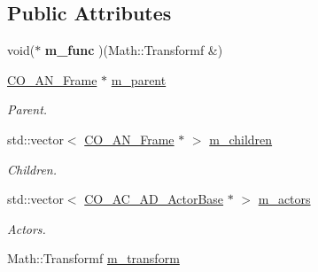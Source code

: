 \subsection*{Public Attributes}
\begin{DoxyCompactItemize}
\item 
\hypertarget{classContent_1_1Animation_1_1Frame_aa5b7dc933e3aa626812e858698397a16}{
void($\ast$ {\bfseries m\_\-func} )(Math::Transformf \&)}
\label{classContent_1_1Animation_1_1Frame_aa5b7dc933e3aa626812e858698397a16}

\item 
\hypertarget{classContent_1_1Animation_1_1Frame_aa5555d09d40cd87b74f96a565028f34f}{
\hyperlink{classContent_1_1Animation_1_1Frame}{CO\_\-AN\_\-Frame} $\ast$ \hyperlink{classContent_1_1Animation_1_1Frame_aa5555d09d40cd87b74f96a565028f34f}{m\_\-parent}}
\label{classContent_1_1Animation_1_1Frame_aa5555d09d40cd87b74f96a565028f34f}

\begin{DoxyCompactList}\small\item\em Parent. \item\end{DoxyCompactList}\item 
\hypertarget{classContent_1_1Animation_1_1Frame_a2439e670ac6b2db494a9eefabc7cf1b7}{
std::vector$<$ \hyperlink{classContent_1_1Animation_1_1Frame}{CO\_\-AN\_\-Frame} $\ast$ $>$ \hyperlink{classContent_1_1Animation_1_1Frame_a2439e670ac6b2db494a9eefabc7cf1b7}{m\_\-children}}
\label{classContent_1_1Animation_1_1Frame_a2439e670ac6b2db494a9eefabc7cf1b7}

\begin{DoxyCompactList}\small\item\em Children. \item\end{DoxyCompactList}\item 
\hypertarget{classContent_1_1Animation_1_1Frame_a0f1db00f5c5e52f353791374f2985b3e}{
std::vector$<$ \hyperlink{classContent_1_1Actor_1_1Admin_1_1ActorBase}{CO\_\-AC\_\-AD\_\-ActorBase} $\ast$ $>$ \hyperlink{classContent_1_1Animation_1_1Frame_a0f1db00f5c5e52f353791374f2985b3e}{m\_\-actors}}
\label{classContent_1_1Animation_1_1Frame_a0f1db00f5c5e52f353791374f2985b3e}

\begin{DoxyCompactList}\small\item\em Actors. \item\end{DoxyCompactList}\item 
\hypertarget{classContent_1_1Animation_1_1Frame_a4d4af395b45e5a4be58b94684114c8cd}{
Math::Transformf \hyperlink{classContent_1_1Animation_1_1Frame_a4d4af395b45e5a4be58b94684114c8cd}{m\_\-transform}}
\label{classContent_1_1Animation_1_1Frame_a4d4af395b45e5a4be58b94684114c8cd}


\end{DoxyCompactItemize}
